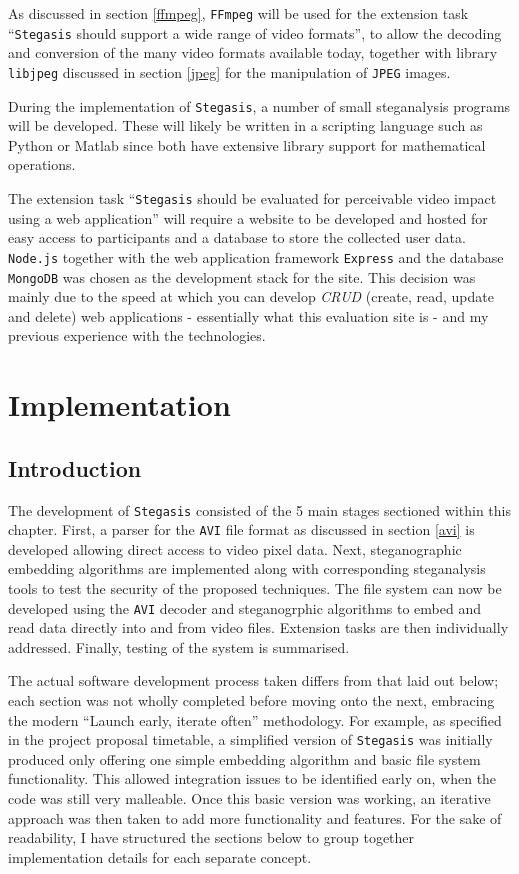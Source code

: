 \documentclass[paper=a4, fontsize=11pt,twoside]{scrartcl}    %
\numberwithin{table}{section}
\numberwithin{figure}{section}
\begin{document}
As discussed in section \ref{ffmpeg}, \texttt{FFmpeg} will be used for the extension task ``\texttt{Stegasis} should support a wide range of video formats'', to allow the decoding and conversion of the many video formats available today, together with library \texttt{libjpeg} discussed in section \ref{jpeg} for the manipulation of \texttt{JPEG} images. 

During the implementation of \texttt{Stegasis}, a number of small steganalysis programs will be developed. These will likely be written in a scripting language such as Python or Matlab since both have extensive library support for mathematical operations.

The extension task ``\texttt{Stegasis} should be evaluated for perceivable video impact using a web application'' will require a website to be developed and hosted for easy access to participants and a database to store the collected user data. \texttt{Node.js} together with the web application framework \texttt{Express} and the database \texttt{MongoDB} was chosen as the development stack for the site. This decision was mainly due to the speed at which you can develop \textit{CRUD} (create, read, update and delete) web applications - essentially what this evaluation site is - and my previous experience with the technologies.


\section{Implementation}

\subsection{Introduction}

The development of \texttt{Stegasis} consisted of the 5 main stages sectioned within this chapter. First, a parser for the \texttt{AVI} file format as discussed in section \ref{avi} is developed allowing direct access to video pixel data. Next, steganographic embedding algorithms are implemented along with corresponding steganalysis tools to test the security of the proposed techniques. The file system can now be developed using the \texttt{AVI} decoder and steganogrphic algorithms to embed and read data directly into and from video files. Extension tasks are then individually addressed. Finally, testing of the system is summarised.

The actual software development process taken differs from that laid out below; each section was not wholly completed before moving onto the next, embracing the modern ``Launch early, iterate often'' methodology. For example, as specified in the project proposal timetable, a simplified version of \texttt{Stegasis} was initially produced only offering one simple embedding algorithm and basic file system functionality. This allowed integration issues to be identified early on, when the code was still very malleable. Once this basic version was working, an iterative approach was then taken to add more functionality and features. For the sake of readability, I have structured the sections below to group together implementation details for each separate concept.
\end{document}
